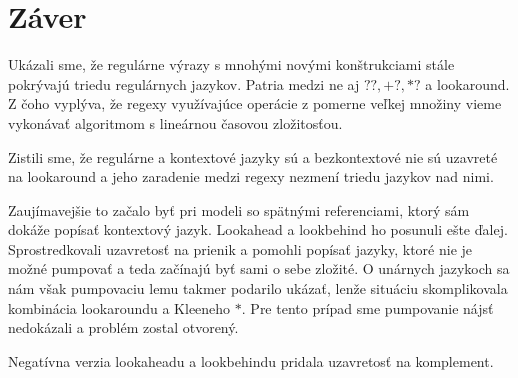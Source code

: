 \chapter*{Záver}\label{chap:conc}
{}

Ukázali sme, že regulárne výrazy s mnohými novými konštrukciami stále pokrývajú triedu regulárnych jazykov. Patria medzi ne aj $??,+?,*?$ a lookaround. Z čoho vyplýva, že regexy využívajúce operácie z pomerne veľkej množiny vieme vykonávať algoritmom s lineárnou časovou zložitosťou.

Zistili sme, že regulárne a kontextové jazyky sú a bezkontextové nie sú uzavreté na lookaround a jeho zaradenie medzi regexy nezmení triedu jazykov nad nimi.

Zaujímavejšie to začalo byť pri modeli so spätnými referenciami, ktorý sám dokáže popísať kontextový jazyk. Lookahead a lookbehind ho posunuli ešte ďalej. Sprostredkovali uzavretosť na prienik a pomohli popísať jazyky, ktoré nie je možné pumpovať a teda začínajú byť sami o sebe zložité. O unárnych jazykoch sa nám však pumpovaciu lemu takmer podarilo ukázať, lenže situáciu skomplikovala kombinácia lookaroundu a Kleeneho $*$. Pre tento prípad sme pumpovanie nájsť nedokázali a problém zostal otvorený.

Negatívna verzia lookaheadu a lookbehindu pridala uzavretosť na komplement.
